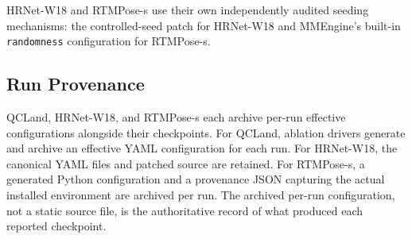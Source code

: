 HRNet-W18 and RTMPose-s use their own independently audited seeding
mechanisms: the controlled-seed patch for HRNet-W18 and MMEngine's
built-in \texttt{randomness} configuration for RTMPose-s.


\subsection{Run Provenance}

QCLand, HRNet-W18, and RTMPose-s each archive per-run effective
configurations alongside their checkpoints. For QCLand, ablation
drivers generate and archive an effective YAML configuration for each
run. For HRNet-W18, the canonical YAML files and patched source are
retained. For RTMPose-s, a generated Python configuration and a
provenance JSON capturing the actual installed environment are
archived per run. The archived per-run configuration, not a static
source file, is the authoritative record of what produced each
reported checkpoint.

